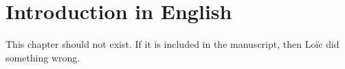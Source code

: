 \setchapterpreamble[u]{\margintoc}
\chapter{Introduction in English}

This chapter should not exist. If it is included in the manuscript, then Loïc did something wrong.